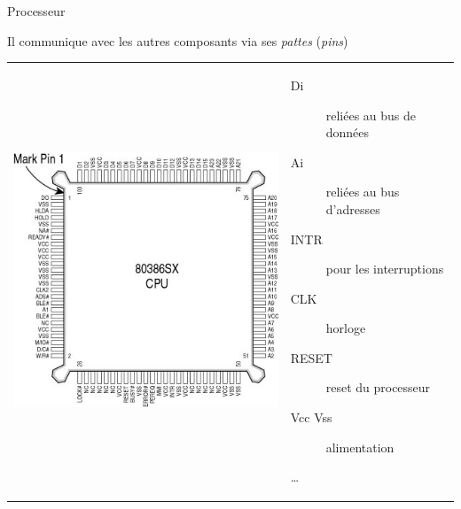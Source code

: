 \documentclass[14pt,xcolor,table]{beamer}
\begin{document}
\begin{frame}[fragile]{Processeur}
	
	Il communique avec les autres composants via ses \emph{pattes} (\textit{pins})
	
	\bigskip
	
	\begin{tabular}{p{4cm}p{6cm}}
	\begin{minipage}[c]{4cm}
	\begin{center}
	\includegraphics[width=1.1\textwidth]{images/i386-sx}
	\source{inconnue}
	\end{center}
	\end{minipage}
	&
	\begin{minipage}[c]{7cm}
	\small
	\begin{description}
	\item[Di] reliées au bus de données
	\item[Ai] reliées au bus d'adresses
	\item[INTR] pour les interruptions
	\item[CLK] horloge
	\item[RESET] reset du processeur
	\item[Vcc Vss] alimentation
	\item[\dots]
	\end{description}
	\end{minipage}
	\\
	\end{tabular}
	
\end{frame}
\end{document}
